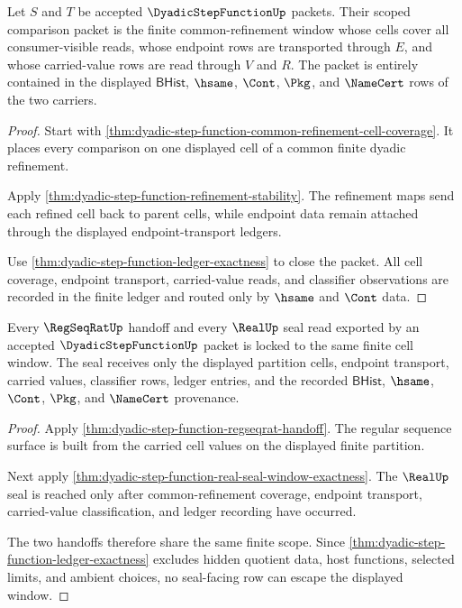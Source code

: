 \begin{theorem}
\label{thm:dyadic-step-function-scoped-window-package}
Let $S$ and $T$ be accepted $\DyadicStepFunctionUp$ packets. Their scoped
comparison packet is the finite common-refinement window whose cells cover all
consumer-visible reads, whose endpoint rows are transported through $E$, and
whose carried-value rows are read through $V$ and $R$. The packet is entirely
contained in the displayed $\mathsf{BHist}$, $\hsame$, $\Cont$, $\Pkg$, and
$\NameCert$ rows of the two carriers.
\end{theorem}
\begin{proof}
Start with \autoref{thm:dyadic-step-function-common-refinement-cell-coverage}.
It places every comparison on one displayed cell of a common finite dyadic
refinement.

Apply \autoref{thm:dyadic-step-function-refinement-stability}. The refinement
maps send each refined cell back to parent cells, while endpoint data remain
attached through the displayed endpoint-transport ledgers.

Use \autoref{thm:dyadic-step-function-ledger-exactness} to close the packet.
All cell coverage, endpoint transport, carried-value reads, and classifier
observations are recorded in the finite ledger and routed only by $\hsame$ and
$\Cont$ data.
\end{proof}

\begin{theorem}
\label{thm:dyadic-step-function-real-regseqrat-scope-lock}
Every $\RegSeqRatUp$ handoff and every $\RealUp$ seal read exported by an
accepted $\DyadicStepFunctionUp$ packet is locked to the same finite cell
window. The seal receives only the displayed partition cells, endpoint
transport, carried values, classifier rows, ledger entries, and the recorded
$\mathsf{BHist}$, $\hsame$, $\Cont$, $\Pkg$, and $\NameCert$ provenance.
\end{theorem}
\begin{proof}
Apply \autoref{thm:dyadic-step-function-regseqrat-handoff}. The regular
sequence surface is built from the carried cell values on the displayed finite
partition.

Next apply \autoref{thm:dyadic-step-function-real-seal-window-exactness}. The
$\RealUp$ seal is reached only after common-refinement coverage, endpoint
transport, carried-value classification, and ledger recording have occurred.

The two handoffs therefore share the same finite scope. Since
\autoref{thm:dyadic-step-function-ledger-exactness} excludes hidden quotient
data, host functions, selected limits, and ambient choices, no seal-facing row
can escape the displayed window.
\end{proof}

